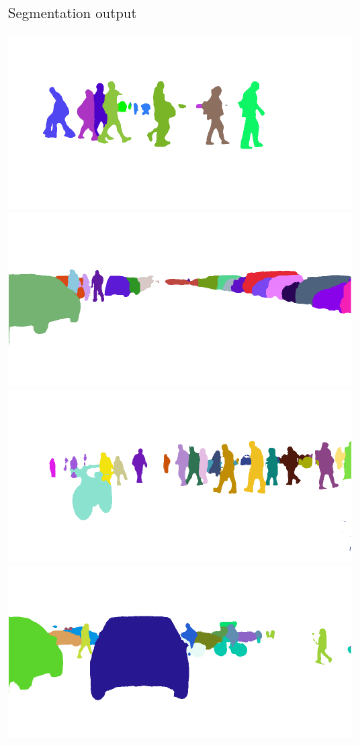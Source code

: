 \begin{figure}[t]
{\begin{subfigure}[t]{0.24\linewidth}
\begin{center}
  \caption{Segmentation output}
\end{center}
\end{subfigure}
\begin{subfigure}[t]{0.24\linewidth}
\begin{center}
		\includegraphics[width=\linewidth,trim={0px 60px 0 0px},clip]{results/segnet_107_output_3.png}
		\includegraphics[width=\linewidth,trim={0px 60px 0 0px},clip]{results/segnet_186_output_3.png}
		\includegraphics[width=\linewidth,trim={0px 60px 0 0px},clip]{results/segnet_242_output_3.png}
		\includegraphics[width=\linewidth,trim={0px 60px 0 0px},clip]{results/segnet_209_output_3.png}

\end{center}
\end{subfigure}}
\end{figure}
